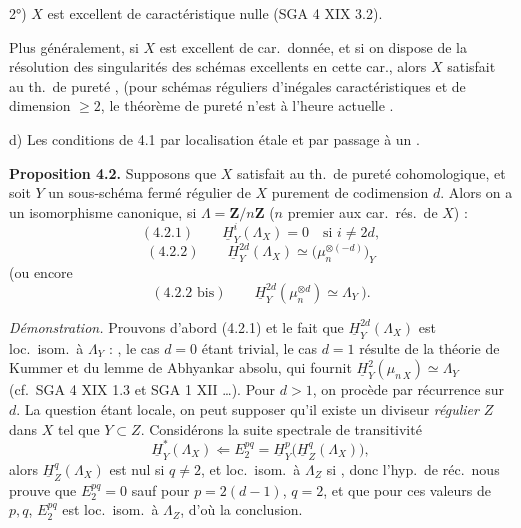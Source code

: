 \documentclass[11pt,a4paper]{article}
\begin{document}
2°) $X$ est excellent de caractéristique nulle (SGA 4 XIX 3.2). 

 Plus généralement,  si $X$ est excellent de car.\ donnée, et si on dispose de la résolution des singularités des schémas excellents en cette car., alors $X$ satisfait au th.\ de pureté  \struck{\ill{}} \ill{}, (pour \ill{} schémas réguliers d'inégales caractéristiques et de dimension $\geq 2$, le théorème de pureté n'est  à l'heure actuelle \ill{} \ill{}.

d) Les conditions de 4.1  par localisation étale et par passage à un \ill{} .

\textbf{Proposition 4.2.} Supposons que $X$ satisfait au th.\ de pureté cohomologique, et soit $Y$ un sous-schéma fermé régulier de $X$ purement de codimension $d$. Alors on a un isomorphisme canonique, si $\Lambda = \mathbf{Z}/n\mathbf{Z}$ ($n$ premier aux car.\ rés.\ de $X$) :
\[
(4.2.1) \qquad \underline{H}^i_Y(\Lambda_X) = 0 \quad \text{si } i \neq 2d ,
\]
\[
(4.2.2) \qquad \underline{H}^{2d}_Y(\Lambda_X) \simeq \bigl(\mu_n^{\otimes(-d)}\bigr)_Y
\]
(ou encore
\[
(4.2.2 \text{ bis}) \qquad \underline{H}^{2d}_Y(\mu_n^{\otimes d}) \simeq \Lambda_Y\ ).
\]


\emph{Démonstration.} Prouvons d'abord (4.2.1) et le fait que $\underline{H}^{2d}_Y(\Lambda_X)$ est loc.\ isom.\ à $\Lambda_Y$ : , le cas $d = 0$ étant trivial, le cas $d = 1$ résulte de la théorie de Kummer et du lemme de Abhyankar absolu, \struck{\ill{}} qui fournit $\underline{H}^2_Y(\mu_{n\,X}) \simeq \Lambda_Y$ (cf.\ SGA 4 XIX 1.3 et SGA 1 XII …). Pour $d > 1$, on procède par récurrence sur $d$. La question étant locale, \struck{\ill{}} on peut supposer qu'il existe un diviseur \emph{régulier} $Z$ dans $X$ tel que $Y \subset Z$.  Considérons la suite spectrale de transitivité
\[
\underline{H}^*_Y(\Lambda_X) \Longleftarrow E_2^{pq} = \underline{H}^p_Y\bigl(\underline{H}^q_Z(\Lambda_X)\bigr) ,
\]
 alors $\underline{H}^q_Z(\Lambda_X)$ est nul si $q \neq 2$, et loc.\ isom.\ à $\Lambda_Z$ si , donc l'hyp.\ de réc.\ nous prouve que $E_2^{pq} = 0$ sauf pour  $p = 2(d-1)$, $q = 2$, et que pour ces valeurs de $p, q$, $E_2^{pq}$ est loc.\ isom.\ à $\Lambda_Z$, d'où la conclusion.
\end{document}
